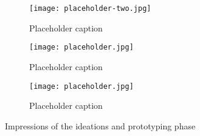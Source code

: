 \begin{figure*}[b]
    \centering
        \begin{subfigure}[b]{0.5\textwidth}
        \texttt{[image: placeholder-two.jpg]}
        \caption{Placeholder caption}
        \label{fig:3_4_combined}
    \end{subfigure}
    \begin{subfigure}[b]{0.23\textwidth}
        \texttt{[image: placeholder.jpg]}
        \caption{Placeholder caption}
        \label{fig:1}
    \end{subfigure}
    \hfill
    \begin{subfigure}[b]{0.23\textwidth}
        \texttt{[image: placeholder.jpg]}
        \caption{Placeholder caption}
        \label{fig:2}
    \end{subfigure}
    \hfill
    \caption{Impressions of the ideations and prototyping phase}
    \label{fig:full_width}
\end{figure*}